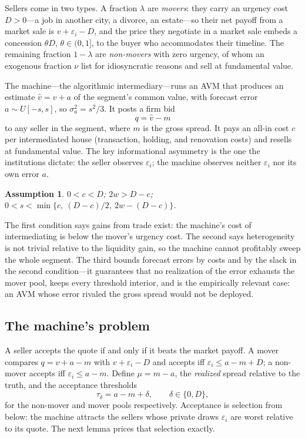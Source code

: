 \documentclass[12pt, letterpaper]{article}
\newtheorem{assumption}{Assumption}
\theoremstyle{remark}
\begin{document}
Sellers come in two types. A fraction $\lambda$ are \emph{movers}: they carry an urgency cost $D > 0$---a job in another city, a divorce, an estate---so their net payoff from a market sale is $v + \varepsilon_i - D$, and the price they negotiate in a market sale embeds a concession $\theta D$, $\theta \in (0,1]$, to the buyer who accommodates their timeline. The remaining fraction $1-\lambda$ are \emph{non-movers} with zero urgency, of whom an exogenous fraction $\nu$ list for idiosyncratic reasons and sell at fundamental value.

The machine---the algorithmic intermediary---runs an AVM that produces an estimate $\hat v = v + a$ of the segment's common value, with forecast error $a \sim U[-s, s]$, so $\sigma_a^2 = s^2/3$. It posts a firm bid
\begin{equation}
q = \hat v - m
\label{eq:quote}
\end{equation}
to any seller in the segment, where $m$ is the gross spread. It pays an all-in cost $c$ per intermediated house (transaction, holding, and renovation costs) and resells at fundamental value. The key informational asymmetry is the one the institutions dictate: the seller observes $\varepsilon_i$; the machine observes neither $\varepsilon_i$ nor its own error $a$.

\begin{assumption}\label{ass:1}
$0 < c < D$; \quad $2w > D - c$; \quad $0 < s < \min\{c,\ (D-c)/2,\ 2w - (D-c)\}$.
\end{assumption}

The first condition says gains from trade exist: the machine's cost of intermediating is below the mover's urgency cost. The second says heterogeneity is not trivial relative to the liquidity gain, so the machine cannot profitably sweep the whole segment. The third bounds forecast errors by costs and by the slack in the second condition---it guarantees that no realization of the error exhausts the mover pool, keeps every threshold interior, and is the empirically relevant case: an AVM whose error rivaled the gross spread would not be deployed.

\subsection{The machine's problem}\label{sec:model-machine}

A seller accepts the quote if and only if it beats the market payoff. A mover compares $q = v + a - m$ with $v + \varepsilon_i - D$ and accepts iff $\varepsilon_i \le a - m + D$; a non-mover accepts iff $\varepsilon_i \le a - m$. Define $\mu = m - a$, the \emph{realized} spread relative to the truth, and the acceptance thresholds
\begin{equation}
\tau_\delta = a - m + \delta, \qquad \delta \in \{0, D\},
\label{eq:thresholds}
\end{equation}
for the non-mover and mover pools respectively. Acceptance is selection from below: the machine attracts the sellers whose private draws $\varepsilon_i$ are worst relative to its quote. The next lemma prices that selection exactly.
\end{document}
